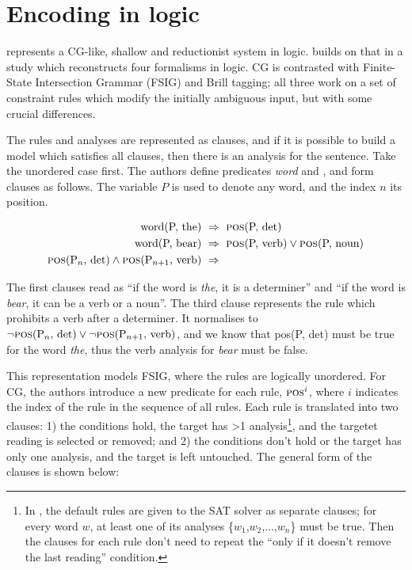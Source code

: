 \section*{Encoding in logic}\label{encoding-in-logic}

\cite{lager98} represents a CG-like, shallow and reductionist system in
logic. \cite{lager_nivre01} builds on that in a study which reconstructs
four formalisms in logic. CG is contrasted with Finite-State
Intersection Grammar (FSIG) and Brill tagging; all three work on a set
of constraint rules which modify the initially ambiguous input, but with some crucial
differences.

The rules and analyses are represented as clauses, and if it is
possible to build a model which satisfies all clauses, then there is
an analysis for the sentence.
Take the unordered case first. The authors define predicates \emph{word}
and \emph{}, and form clauses as follows. The variable $P$ is used to
denote any word, and the index $n$ its position.

\begin{align*}
\text{word(P, the)} \  &\Rightarrow \ \text{{\sc pos}(P, det)} \\
\text{word(P, bear)} \ &\Rightarrow \ \text{{\sc pos}(P, verb)} \vee \text{{\sc pos}(P, noun)} \\
\text{{\sc pos}(P$_n$, det)} \wedge \text{{\sc pos}(P$_{n+1}$, verb)} \ &\Rightarrow 
\end{align*}

\noindent The first clauses read as ``if the word is \emph{the}, it
is a determiner'' and ``if the word is \emph{bear}, it can be a verb or a noun''.
The third clause represents the rule which prohibits a verb after a
determiner. It normalises to $\neg \text{{\sc pos}(P$_n$, det)} \vee \neg \text{{\sc pos}(P$_{n+1}$, verb)}$, and we know that {\sc pos}(P, det) must be true for
the word \emph{the}, thus the verb analysis for \emph{bear} must be
false.

This representation models FSIG, where the rules are logically
unordered. For CG, the authors introduce a new predicate for each rule,
$\text{{\sc pos}}^i$, where $i$ indicates the index of the rule in the
sequence of all rules.
Each rule is translated into two
clauses: 1) the conditions hold, the target has >1 analysis\footnote{In \cite{listenmaa_claessen2015}, the default rules
  are given to the SAT solver as separate clauses; for every word
  $w$, at least one of its analyses \{$w_1$,$w_2$,...,$w_n$\} must be
  true. Then the clauses for each rule don't need to repeat the ``only
  if it doesn't remove the last reading'' condition.}, and the 
targetet reading is selected or removed; and
2) the conditions don't hold or the target has only one analysis, and the target is left untouched. The general form of the clauses is shown below:

